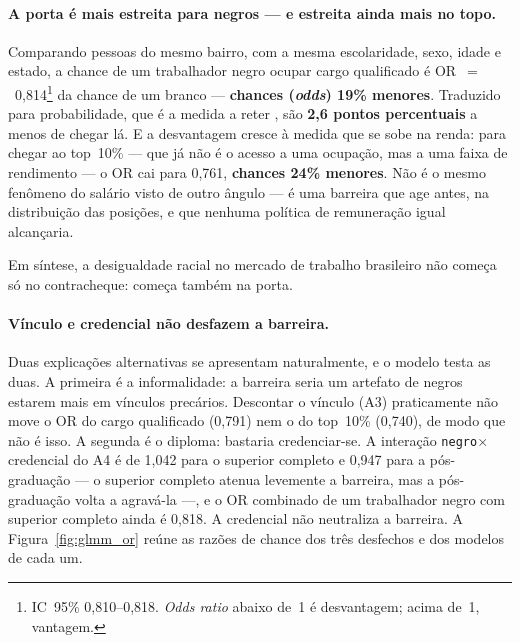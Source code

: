 \documentclass[12pt, a4paper, oneside]{article}
\begin{document}
\paragraph{A porta é mais estreita para negros --- e estreita ainda mais no topo.}
Comparando pessoas do mesmo bairro, com a mesma escolaridade, sexo, idade e estado,
a chance de um trabalhador negro ocupar cargo qualificado é
OR~$=$~0,814\footnote{IC~95\% 0,810--0,818. \emph{Odds ratio} abaixo de~1 é
desvantagem; acima de~1, vantagem.} da chance de um branco --- \textbf{chances (\emph{odds})
19\% menores}. Traduzido para probabilidade, que é a medida a reter
\cite{angrist2009}, são \textbf{2,6 pontos percentuais} a menos de chegar
lá. E a desvantagem cresce à medida que se sobe na renda: para chegar ao top~10\% ---
que já não é o acesso a uma ocupação, mas a uma faixa de rendimento --- o OR cai para
0,761, \textbf{chances 24\% menores}. Não é o mesmo fenômeno do
salário visto de outro ângulo --- é uma barreira que age antes, na distribuição das
posições, e que nenhuma política de remuneração igual alcançaria.

Em síntese, a desigualdade racial no mercado de trabalho brasileiro não começa
só no contracheque: começa também na porta.

\paragraph{Vínculo e credencial não desfazem a barreira.}
Duas explicações alternativas se apresentam naturalmente, e o modelo testa as duas. A
primeira é a informalidade: a barreira seria um artefato de negros estarem mais em
vínculos precários. Descontar o vínculo (A3) praticamente não move o OR do cargo
qualificado (0,791) nem o do top~10\% (0,740), de modo que não é
isso. A segunda é o diploma: bastaria credenciar-se. A interação
\texttt{negro}$\times$credencial do A4 é de 1,042 para o superior completo e
0,947 para a pós-graduação --- o superior completo atenua levemente a barreira, mas a pós-graduação volta a agravá-la ---, e o OR combinado de um
trabalhador negro com superior completo ainda é 0,818. A credencial não
neutraliza a barreira. A Figura~\ref{fig:glmm_or} reúne as razões
de chance dos três desfechos e dos modelos de cada um.
\end{document}
